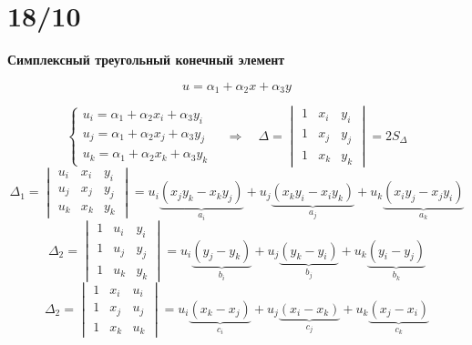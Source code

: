 
	\section*{18/10}
	\begin{center}
		\textbf{Симплексный треугольный конечный элемент}
	\end{center}
	\[
	u=\alpha_1+\alpha_2 x +\alpha_3 y
	\]
	\begin{center}
	\end{center}
	\[
	\begin{cases}
		u_i=\alpha_1+\alpha_2 x_i +\alpha_3 y_i \\
		u_j=\alpha_1+\alpha_2 x_j +\alpha_3 y_j \\
		u_k=\alpha_1+\alpha_2 x_k +\alpha_3 y_k 
	\end{cases} \quad \Rightarrow \quad \Delta = \begin{vmatrix}
	1&x_i&y_i\\
	1&x_j&y_j\\
	1&x_k&y_k
	\end{vmatrix} = 2S_{\Delta}
	\]
	\[
	\Delta_1=\begin{vmatrix}
	u_i&x_i&y_i\\
	u_j&x_j&y_j\\
	u_k&x_k&y_k
	\end{vmatrix}
	 = u_i \underbrace{(x_jy_k-x_ky_j)}_{a_i} +u_j \underbrace{(x_ky_i-x_iy_k)}_{a_j}+u_k \underbrace{(x_iy_j-x_jy_i)}_{a_k}
	\]
	\[
	\Delta_2=\begin{vmatrix}
		1&u_i&y_i\\
		1&u_j&y_j\\
		1&u_k&y_k
	\end{vmatrix}
	= u_i \underbrace{(y_j-y_k)}_{b_i}+u_j \underbrace{(y_k-y_i)}_{b_j}+u_k \underbrace{(y_i-y_j)}_{b_k}
	\]
	\[
	\Delta_2=\begin{vmatrix}
		1&x_i&u_i\\
		1&x_j&u_j\\
		1&x_k&u_k
	\end{vmatrix}
	= u_i \underbrace{(x_k-x_j)}_{c_i}+u_j \underbrace{(x_i-x_k)}_{c_j}+u_k \underbrace{(x_j-x_i)}_{c_k}
	\]

